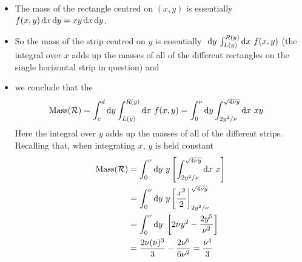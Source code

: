 \begin{eg}[Mass]
\begin{itemize}
\item
  The mass of the rectangle centred on $(x,y)$
        is essentially $f(x,y)\,\mathrm{d}x\,\mathrm{d}y=xy\,\mathrm{d}x\,\mathrm{d}y$.
\item 
   So the mass of the strip centred on $y$ is 
         essentially $\ \mathrm{d}y\, \int_{L(y)}^{R(y)}\mathrm{d}x\ f(x,y) $ 
   (the integral over $x$ adds up the masses of all of the different rectangles     on the single horizontal strip in question) and  
\item
   we conclude that the
\begin{align*}
    \text{Mass}(\cR)
        &=\int_c^d \dee{y}\int_{L(y)}^{R(y)} \dee{x}\ f(x,y) 
         =\int_0^{\nu} \dee{y}\int_{2y^2/\nu}^{\sqrt{4\nu y}} \dee{x}\ xy 
\end{align*}
Here the integral over $y$ adds up the masses of all of the different strips.
Recalling that, when integrating $x$, $y$ is held constant
\begin{align*}
\text{Mass}(\cR)
        &=\int_0^{\nu} \dee{y}\  y\left[
                 \int_{2y^2/\nu}^{\sqrt{4\nu y}} \dee{x}\ x\right] \\
        &=\int_0^{\nu} \dee{y}\  y\left[\frac{x^2}{2}\right]
                                     _{2y^2/\nu}^{\sqrt{4\nu y}} \\
        &=\int_0^{\nu} \dee{y}\ 
             \left[2\nu y^2-\frac{2y^5}{\nu^2}\right] \\
        &= \frac{2\nu (\nu)^3}{3}-\frac{2\nu^6}{6\nu^2}
         =\frac{\nu^4}{3}
\end{align*}
\end{itemize}
\end{eg}


